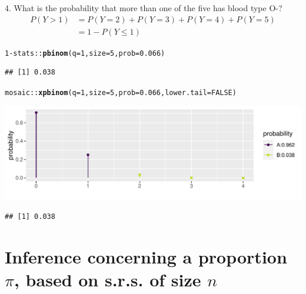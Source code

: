 \documentclass[10pt]{beamer}\usepackage[]{graphicx}\usepackage[]{color}
\makeatletter
\def\maxwidth{ %
  \ifdim\Gin@nat@width>\linewidth
    \linewidth
  \else
    \Gin@nat@width
  \fi
}
\newcommand{\hlnum}[1]{\textcolor[rgb]{0.686,0.059,0.569}{#1}}%
\newcommand{\hlopt}[1]{\textcolor[rgb]{0,0,0}{#1}}%
\newcommand{\hlstd}[1]{\textcolor[rgb]{0.345,0.345,0.345}{#1}}%
\newcommand{\hlkwc}[1]{\textcolor[rgb]{0.333,0.667,0.333}{#1}}%
\newcommand{\hlkwd}[1]{\textcolor[rgb]{0.737,0.353,0.396}{\textbf{#1}}}%
\newenvironment{kframe}{%
 \def\at@end@of@kframe{}%
 \ifinner\ifhmode%
  \def\at@end@of@kframe{\end{minipage}}%
  \begin{minipage}{\columnwidth}%
 \fi\fi%
 \def\FrameCommand##1{\hskip\@totalleftmargin \hskip-\fboxsep
 \colorbox{shadecolor}{##1}\hskip-\fboxsep
     \hskip-\linewidth \hskip-\@totalleftmargin \hskip\columnwidth}%
 \MakeFramed {\advance\hsize-\width
   \@totalleftmargin\z@ \linewidth\hsize
   \@setminipage}}%
 {\par\unskip\endMakeFramed%
 \at@end@of@kframe}
\newenvironment{knitrout}{}{} %
\makeatother
\begin{document}
\begin{frame}[fragile]{4. What is the probability that more than one of the five has blood type O-?}
	\footnotesize
	\begin{align*}
	P(Y > 1) & = P(Y = 2) + P(Y = 3) + P(Y=4) + P(Y=5) \\
	& = 1 - P(Y \leq 1)
	\end{align*}
	
	
\begin{knitrout}\tiny
{}\color{fgcolor}\begin{kframe}
\begin{alltt}
\hlnum{1} \hlopt{-} \hlstd{stats}\hlopt{::}\hlkwd{pbinom}\hlstd{(}\hlkwc{q} \hlstd{=} \hlnum{1}\hlstd{,} \hlkwc{size} \hlstd{=} \hlnum{5}\hlstd{,} \hlkwc{prob} \hlstd{=} \hlnum{0.066}\hlstd{)}
\end{alltt}
\begin{verbatim}
## [1] 0.038
\end{verbatim}
\begin{alltt}
\hlstd{mosaic}\hlopt{::}\hlkwd{xpbinom}\hlstd{(}\hlkwc{q} \hlstd{=} \hlnum{1}\hlstd{,} \hlkwc{size} \hlstd{=} \hlnum{5}\hlstd{,} \hlkwc{prob} \hlstd{=} \hlnum{0.066}\hlstd{,} \hlkwc{lower.tail} \hlstd{=} \hlnum{FALSE}\hlstd{)}
\end{alltt}
\end{kframe}

{\centering \includegraphics[width=\maxwidth]{figure/unnamed-chunk-12-1} 

}


\begin{kframe}\begin{verbatim}
## [1] 0.038
\end{verbatim}
\end{kframe}
\end{knitrout}
	
\end{frame}



\section{Inference concerning a proportion $\pi$, based on s.r.s. of size $n$}
\end{document}
